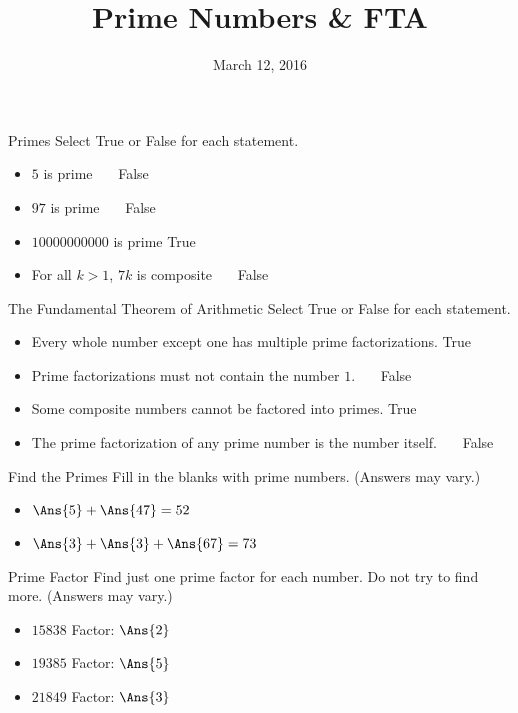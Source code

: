 \documentclass[12pt,letterpaper]{article}
\title{Prime Numbers \& FTA}
\date{March 12, 2016}
\begin{document}
\maketitle

\thispagestyle{empty}

\begin{problem}{Primes}
Select True or False for each statement.

\begin{itemize}
 \item $5$ is prime \hfill {}~~~False
 \item $97$ is prime \hfill {}~~~False
 \item $10000000000$ is prime \hfill True~~~
 \item For all $k>1$, $7k$ is composite \hfill {}~~~False
\end{itemize}
\end{problem}

\begin{problem}{The Fundamental Theorem of Arithmetic}
 Select True or False for each statement.

 \begin{itemize}
  \item Every whole number except one has multiple prime factorizations.
  \hfill True~~~
  \item Prime factorizations must not contain the number $1$.
  \hfill {}~~~False
  \item Some composite numbers cannot be factored into primes.
  \hfill True~~~
  \item The prime factorization of any prime number is the number itself.
  \hfill {}~~~False
 \end{itemize}

\end{problem}

\begin{problem}{Find the Primes}
 Fill in the blanks with prime numbers. (Answers may vary.)

 \begin{itemize}
  \item $\Ans{5} + \Ans{47} = 52$
  \item $\Ans{3} + \Ans{3} + \Ans{67} = 73$
 \end{itemize}
\end{problem}


\begin{problem}{Prime Factor}
 Find just one prime factor for each number. Do not try to find more.
 (Answers may vary.)

 \begin{itemize}
  \item $15838$ \hfill Factor: $\Ans{2}$
  \item $19385$ \hfill Factor: $\Ans{5}$
  \item $21849$ \hfill Factor: $\Ans{3}$
 \end{itemize}
\end{problem}
\end{document}
